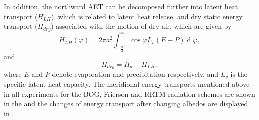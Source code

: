 In addition, the northward AET can be decomposed further into latent heat transport ($H_{LH}$), which is related to latent heat release, and dry static energy transport ($H_{dry}$) associated with the motion of dry air, which are given by 
\begin{equation}
	H_{LH}(\varphi)= 2\pi a^2\int_{-\frac{\pi}{2}}^{\varphi}\operatorname{cos}\varphi  L_v(E-P)\operatorname{d}\varphi,
\end{equation}
and 
\begin{equation}
H_{dry}=H_a-H_{LH},
\end{equation}
where $E$ and $P$ denote evaporation and precipitation respectively, and $L_v$ is the specific latent heat capacity. The meridional energy transports mentioned above in all experiments for the BOG, Frierson and RRTM radiation schemes are shown in the  and the changes of energy transport after changing albedos are displayed in .

